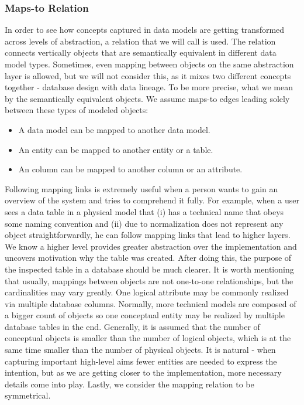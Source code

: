 \subsubsection{Maps-to Relation}

In order to see how concepts captured in data models are getting transformed across levels of abstraction, a relation that we will call  is used. The relation connects vertically objects that are semantically equivalent in different data model types.
Sometimes, even mapping between objects on the same abstraction layer is allowed, but we will not consider this, as it mixes two different concepts together - database design with data lineage. 
To be more precise, what we mean by the semantically equivalent objects. We assume maps-to edges leading solely between these types of modeled objects: 
\begin{itemize}
	\item A data model can be mapped to another data model.
	\item An entity can be mapped to another entity or a table.
	\item An column can be mapped to another column or an attribute.
\end{itemize}
Following mapping links is extremely useful when a person wants to gain an overview of the system and tries to comprehend it fully. 
For example, when a user sees a data table in a physical model that (i) has a technical name that obeys some naming convention and (ii) due to normalization does not represent any object straightforwardly, he can follow mapping links that lead to higher layers. We know a higher level provides greater abstraction over the implementation and uncovers motivation why the table was created. 
After doing this, the purpose of the inspected table in a database should be much clearer.
It is worth mentioning that usually, mappings between objects are not one-to-one relationships, but the cardinalities may vary greatly. One logical attribute may be commonly realized via multiple database columns.
Normally, more technical models are composed of a bigger count of objects so one conceptual entity may be realized by multiple database tables in the end. Generally, it is assumed that the number of conceptual objects is smaller than the number of logical objects, which is at the same time smaller than the number of physical objects. It is natural - when capturing important high-level aims fewer entities are needed to express the intention, but as we are getting closer to the implementation, more necessary details come into play.
Lastly, we consider the mapping relation to be symmetrical.

